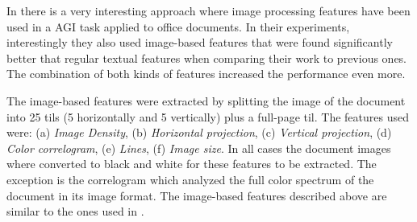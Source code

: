 In \parencite{chen2012genre} there is a very interesting approach where image processing features have been used in a AGI task applied to office documents. In their experiments, interestingly they also used image-based features that were found significantly better that regular textual features when comparing their work to previous ones. The combination of both kinds of features increased the performance even more.

The image-based features were extracted by splitting the image of the document into 25 tils (5 horizontally and 5 vertically) plus a full-page til. The features used were: (a) \textit{Image Density}, (b) \textit{Horizontal projection}, (c) \textit{Vertical projection}, (d) \textit{Color correlogram}, (e) \textit{Lines}, (f) \textit{Image size}. In all cases the document images where converted to black and white for these features to be extracted. The exception is the correlogram which analyzed the full color spectrum of the document in its image format. The image-based features described above are similar to the ones used in \parencite{clark2014you}.


